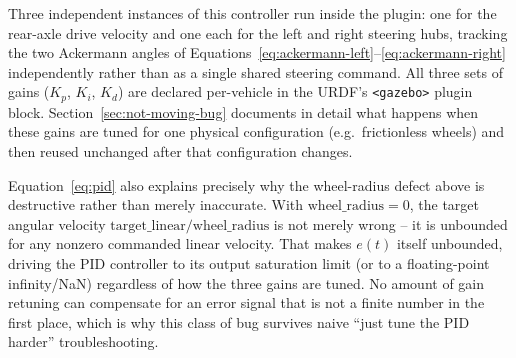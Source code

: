 Three independent instances of this controller run inside the
plugin: one for the rear-axle drive velocity and one each for the
left and right steering hubs, tracking the two Ackermann angles of
Equations~\ref{eq:ackermann-left}--\ref{eq:ackermann-right}
independently rather than as a single shared steering command. All
three sets of gains ($K_p$, $K_i$, $K_d$) are declared per-vehicle in
the URDF's \texttt{<gazebo>} plugin block. Section~\ref{sec:not-moving-bug}
documents in detail what happens when these gains are tuned for one
physical configuration (e.g.\ frictionless wheels) and then reused
unchanged after that configuration changes.

Equation~\ref{eq:pid} also explains precisely why the wheel-radius
defect above is destructive rather than merely inaccurate. With
$\text{wheel\_radius} = 0$, the target angular velocity
$\text{target\_linear}/\text{wheel\_radius}$ is not merely wrong --
it is unbounded for any nonzero commanded linear velocity. That
makes $e(t)$ itself unbounded, driving the PID controller to its
output saturation limit (or to a floating-point infinity/NaN)
regardless of how the three gains are tuned. No amount of gain
retuning can compensate for an error signal that is not a finite
number in the first place, which is why this class of bug survives
naive ``just tune the PID harder'' troubleshooting.

